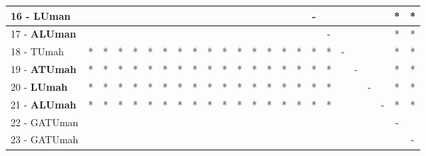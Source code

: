\begin{table}[h]
\begin{center}
\begin{tabular}{lcc|cc|cc|cc|cc|cc|cc|cc|cc|cc|cc|c}
16 - \textbf{LUman}	&   &   &   &   &   &   &   &   &   &   &   &   &   &   &   & - &   &   &   &   &   & * & * \\ \hline
17 - \textbf{ALUman}	&   &   &   &   &   &   &   &   &   &   &   &   &   &   &   &   & - &   &   &   &   & * & * \\
18 - TUmah	& * & * & * & * & * & * & * & * & * & * & * & * & * & * & * & * & * & - &   &   &   & * & * \\ \hline
19 - \textbf{ATUmah}	& * & * & * & * & * & * & * & * & * & * & * & * & * & * & * & * & * &   & - &   &   & * & * \\
20 - \textbf{LUmah}	& * & * & * & * & * & * & * & * & * & * & * & * & * & * & * & * & * &   &   & - &   & * & * \\ \hline
21 - \textbf{ALUmah}	& * & * & * & * & * & * & * & * & * & * & * & * & * & * & * & * & * &   &   &   & - & * & * \\
22 - GATUman	&   &   &   &   &   &   &   &   &   &   &   &   &   &   &   &   &   &   &   &   &   & - &   \\ \hline
23 - GATUmah	&   &   &   &   &   &   &   &   &   &   &   &   &   &   &   &   &   &   &   &   &   &   & - \\\end{tabular}
\label{stratsALCKappaFriedSVM}
\end{center}
\end{table}